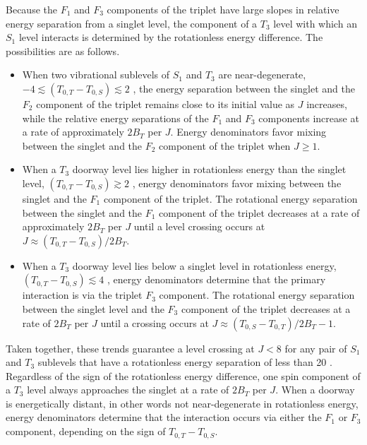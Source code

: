 Because the $F_1$ and $F_3$ components of the triplet have large
slopes in relative energy separation from a singlet level, the
component of a $T_3$ level with which an $S_1$ level interacts is
determined by the rotationless energy difference.  The possibilities
are as follows.
\begin{itemize}
\item When two vibrational sublevels of $S_1$ and $T_3$ are
  near-degenerate, $-4 \lesssim (T_{0,T} - T_{0,S}) \lesssim 2$ \rcm,
  the energy separation between the singlet and the $F_2$ component of
  the triplet remains close to its initial value as $J$ increases,
  while the relative energy separations of the $F_1$ and $F_3$
  components increase at a rate of approximately $2B_T$ per $J$.
  Energy denominators favor mixing between the singlet and the $F_2$
  component of the triplet when $J \ge 1$.
\item When a $T_3$ doorway level lies higher in rotationless energy
  than the singlet level, $ (T_{0,T} - T_{0,S}) \gtrsim 2$ \rcm,
  energy denominators favor mixing between the singlet and the $F_1$
  component of the triplet.  The rotational energy separation between
  the singlet and the $F_1$ component of the triplet decreases at a
  rate of approximately $2B_T$ per $J$ until a level crossing occurs
  at $J \approx (T_{0,T} - T_{0,S}) / 2 B_T$.
\item When a $T_3$ doorway level lies below a singlet level in
  rotationless energy, $(T_{0,T} - T_{0,S}) \lesssim 4$ \rcm, energy
  denominators determine that the primary interaction is via the
  triplet $F_3$ component.  The rotational energy separation between
  the singlet level and the $F_3$ component of the triplet decreases
  at a rate of $2B_T$ per $J$ until a crossing occurs at $J \approx
  (T_{0,S} - T_{0,T}) / 2 B_T - 1$.
\end{itemize}
Taken together, these trends guarantee a level crossing at $J<8$ for
any pair of $S_1$ and $T_3$ sublevels that have a rotationless energy
separation of less than 20 \rcm.  Regardless of the sign of the
rotationless energy difference, one spin component of a $T_3$ level
always approaches the singlet at a rate of $2B_T$ per $J$.  When a
doorway is energetically distant, in other words not near-degenerate
in rotationless energy, energy denominators determine that the
interaction occurs via either the $F_1$ or $F_3$ component, depending
on the sign of $T_{0,T} - T_{0,S}$.

